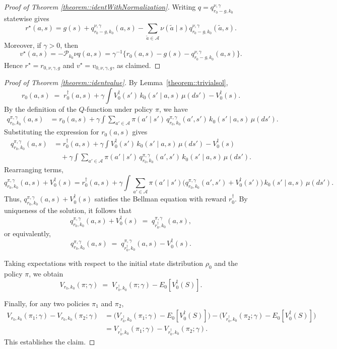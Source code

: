 \documentclass[11pt]{article}
\theoremstyle{plain}
\begin{document}
\begin{proof}[Proof of Theorem \ref{theorem::identWithNormalization}]
Writing \(q=q_{r_0-g,k_0}^{\nu,\gamma}\) statewise gives
\[
r^\star(a,s)
=
g(s)+q_{r_0-g,k_0}^{\nu,\gamma}(a,s)
-\sum_{\tilde a\in\mathcal A}\nu(\tilde a\mid s)
q_{r_0-g,k_0}^{\nu,\gamma}(\tilde a,s).
\]
Moreover, if \(\gamma>0\), then
\[
v^\star(a,s)
=
-\mathcal P_{k_0}\nu q(a,s)
=
\gamma^{-1}\{r_0(a,s)-g(s)-q_{r_0-g,k_0}^{\nu,\gamma}(a,s)\}.
\]
Hence \(r^\star=r_{0,\nu,\gamma,g}\) and
\(v^\star=v_{0,\nu,\gamma,g}\), as claimed.
\end{proof}


\begin{proof}[Proof of Theorem \ref{theorem::identvalue}]
 By Lemma~\ref{theorem::trivialsol},
\[
r_0(a,s) \;=\; r_0^\dagger(a,s) + \gamma \int V_0^\dagger(s') \, k_0(s' \mid a,s)\,\mu(ds') - V_0^\dagger(s).
\]
By the definition of the $Q$-function under policy $\pi$, we have
\begin{align*}
q^{\pi,\gamma}_{r_0,k_0}(a,s) 
&= r_0(a,s) + \gamma \int \sum_{a' \in \mathcal{A}} \pi(a' \mid s') \, q^{\pi,\gamma}_{r_0,k_0}(a',s') \, k_0(s' \mid a,s) \,\mu(ds').
\end{align*}
Substituting the expression for $r_0(a,s)$ gives
\begin{align*}
q^{\pi,\gamma}_{r_0,k_0}(a,s) 
&= r_0^\dagger(a,s) + \gamma \int V_0^\dagger(s') \, k_0(s' \mid a,s)\,\mu(ds') - V_0^\dagger(s) \\
&\quad + \gamma \int \sum_{a' \in \mathcal{A}} \pi(a' \mid s') \, q^{\pi,\gamma}_{r_0,k_0}(a',s') \, k_0(s' \mid a,s)\,\mu(ds').
\end{align*}
Rearranging terms,
\[
q^{\pi,\gamma}_{r_0,k_0}(a,s) + V_0^\dagger(s)
= r_0^\dagger(a,s) + \gamma \int \sum_{a' \in \mathcal{A}} \pi(a' \mid s') \big(q^{\pi,\gamma}_{r_0,k_0}(a',s') + V_0^\dagger(s')\big)\,k_0(s' \mid a,s)\,\mu(ds').
\]
Thus, \(q^{\pi,\gamma}_{r_0,k_0}(a,s) + V_0^\dagger(s)\) satisfies the Bellman equation with reward \(r_0^\dagger\).  
By uniqueness of the solution, it follows that
\[
q^{\pi,\gamma}_{r_0,k_0}(a,s) + V_0^\dagger(s) \;=\; q^{\pi,\gamma}_{r_0^\dagger,k_0}(a,s),
\]
or equivalently,
\[
q^{\pi,\gamma}_{r_0,k_0}(a,s) \;=\; q^{\pi,\gamma}_{r_0^\dagger,k_0}(a,s) - V_0^\dagger(s).
\]

Taking expectations with respect to the initial state distribution $\rho_0$ and the policy $\pi$, we obtain
\[
V_{r_0,k_0}(\pi; \gamma) \;=\; V_{r_0^\dagger,k_0}(\pi; \gamma) - E_0[V_0^\dagger(S)].
\]

Finally, for any two policies $\pi_1$ and $\pi_2$,
\begin{align*}
V_{r_0,k_0}(\pi_1; \gamma) - V_{r_0,k_0}(\pi_2; \gamma) 
&= \big(V_{r_0^\dagger,k_0}(\pi_1; \gamma) - E_0[V_0^\dagger(S)]\big) 
 - \big(V_{r_0^\dagger,k_0}(\pi_2; \gamma) - E_0[V_0^\dagger(S)]\big) \\
&= V_{r_0^\dagger,k_0}(\pi_1; \gamma) - V_{r_0^\dagger,k_0}(\pi_2; \gamma).
\end{align*}
This establishes the claim.
\end{proof}
 
\end{document}
